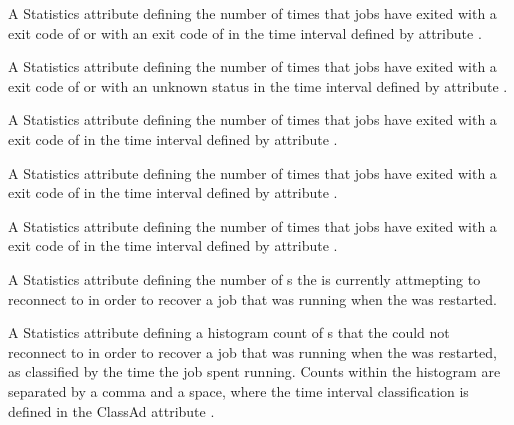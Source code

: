 \begin{description}
\item[\AdAttr{JobsExitedNormally}:]  A Statistics attribute defining
  the number of times that jobs have exited 
  with a  exit code of  or with an
  exit code of 
  in the time interval defined by attribute .

\item[\AdAttr{JobsExitException}:]  A Statistics attribute defining
  the number of times that jobs 
  have exited with a  exit code of 
  or with an unknown status
  in the time interval defined by attribute .

\item[\AdAttr{JobsKilled}:]  A Statistics attribute defining
  the number of times that jobs 
  have exited with a  exit code of 
  in the time interval defined by attribute .

\item[\AdAttr{JobsMissedDeferralTime}:]  A Statistics attribute defining
  the number of times that jobs
  have exited with a  exit code of 
  in the time interval defined by attribute .

\item[\AdAttr{JobsNotStarted}:]  A Statistics attribute defining
  the number of times that jobs 
  have exited with a  exit code of 
  in the time interval defined by attribute .

\item[\AdAttr{JobsRestartReconnectsAttempting}:]
  A Statistics attribute defining the number of s the
   is currently attmepting to reconnect to in order to
  recover a job that was running when the  was restarted.

\item[\AdAttr{JobsRestartReconnectsBadput}:]
  A Statistics attribute defining a histogram count of s
  that the  could not reconnect to in order to recover
  a job that was running when the  was restarted,
  as classified by the time the job spent running.
  Counts within the histogram are separated by a comma and a space,
  where the time interval classification is defined in the ClassAd attribute
  .


\end{description}

